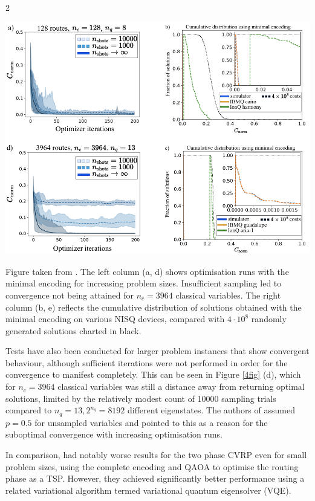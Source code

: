 \documentclass [10pt]{article}
\begin{document}
\begin {multicols}{2}
\begin {figure*}[!ht]
\includegraphics {4fig}
\caption	{
	Figure taken from \cite{effvrp}. The left column (a, d) shows optimisation
	runs with the minimal encoding for increasing problem sizes. Insufficient
	sampling led to convergence not being attained for $n_c = 3964$ classical
	variables. The right column (b, e) reflects the cumulative distribution of
	solutions obtained with the minimal encoding on various NISQ devices,
	compared with $4 \cdot 10^8$ randomly generated solutions charted in black.
}
\label {4fig}
\end {figure*}

Tests have also been conducted for larger problem instances that show
convergent behaviour, although sufficient iterations were not performed in
order for the convergence to manifest completely. This can be seen in
Figure \ref{4fig} (d), which for $n_c = 3964$ classical variables was still
a distance away from returning optimal solutions, limited by the relatively
modest count of 10000 sampling trials compared to $n_q = 13, 2^{n_q} = 8192$
different eigenstates. The authors of \cite{effvrp} assumed $p = 0.5$ for
unsampled variables and pointed to this as a reason for the suboptimal
convergence with increasing optimisation runs.

In comparison, \cite{cvrpqaoa} had notably worse results for the two phase
CVRP even for small problem sizes, using the complete encoding and QAOA to
optimise the routing phase as a TSP. However, they achieved significantly
better performance using a related variational algorithm termed variational
quantum eigensolver (VQE).


\end{multicols}
\end{document}
